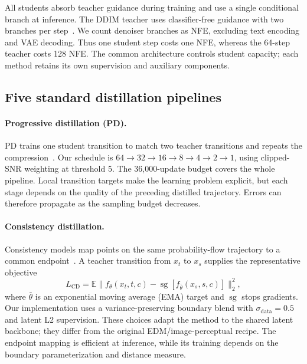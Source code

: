 \documentclass[10pt,twocolumn,letterpaper]{article}
\newcommand{\sg}{\operatorname{sg}}
\begin{document}
All students absorb teacher guidance during training and use a single
conditional branch at inference. The DDIM teacher uses classifier-free
guidance with two branches per step~\cite{song2021ddim}. We count denoiser
branches as NFE, excluding text encoding and VAE decoding. Thus one student
step costs one NFE, whereas the 64-step teacher costs 128 NFE. The common
architecture controls student capacity; each method retains its own
supervision and auxiliary components.

\subsection{Five standard distillation pipelines}
\paragraph{Progressive distillation (PD).}
PD trains one student transition to match two teacher transitions and
repeats the compression~\cite{salimans2022progressive}. Our schedule is
$64\!\rightarrow\!32\!\rightarrow\!16\!\rightarrow\!8\!\rightarrow\!4
\!\rightarrow\!2\!\rightarrow\!1$, using clipped-SNR weighting at threshold
5. The 36,000-update budget covers the whole pipeline. Local transition
targets make the learning problem explicit, but each stage depends on the
quality of the preceding distilled trajectory. Errors can therefore
propagate as the sampling budget decreases.

\paragraph{Consistency distillation.}
Consistency models map points on the same probability-flow trajectory to
a common endpoint~\cite{song2023consistency}. A teacher transition from
$x_t$ to $x_s$ supplies the representative objective
\begin{equation}
L_{\mathrm{CD}}=\mathbb E\|f_\theta(x_t,t,c)
-\sg[f_{\bar\theta}(x_s,s,c)]\|_2^2,
\end{equation}
where $\bar\theta$ is an exponential moving average (EMA) target and $\sg$
stops gradients. Our implementation uses a variance-preserving boundary
blend with $\sigma_{\mathrm{data}}=0.5$ and latent L2 supervision. These
choices adapt the method to the shared latent backbone; they differ from
the original EDM/image-perceptual recipe. The endpoint mapping is efficient
at inference, while its training depends on the boundary parameterization
and distance measure.
\end{document}
